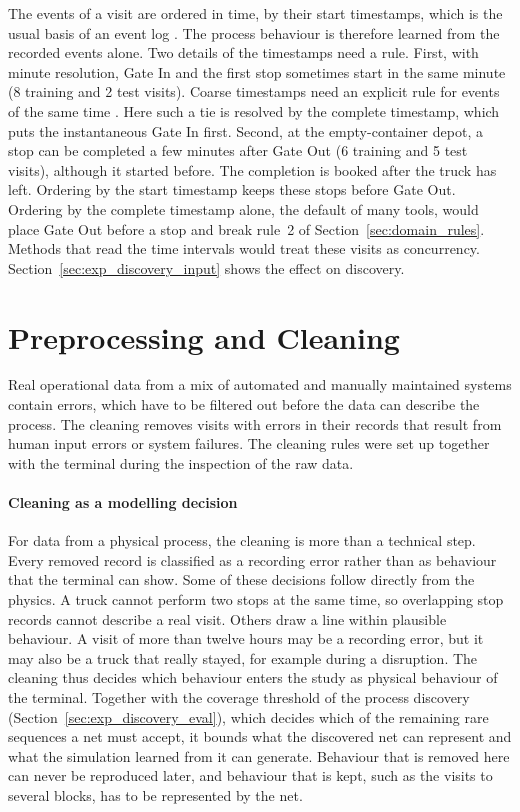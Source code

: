 The events of a visit are ordered in time, by their start timestamps, which is the
usual basis of an event log \cite{DeWeerdt2022EventData}. The process behaviour is
therefore learned from the recorded events alone. Two details of the timestamps
need a rule. First, with minute resolution, Gate In and the first stop sometimes
start in the same minute (8 training and 2 test visits). Coarse timestamps need an
explicit rule for events of the same time \cite{vanderAalst2022Order}. Here such a
tie is resolved by the complete timestamp, which puts the instantaneous Gate In
first. Second, at the empty-container depot, a stop can be
completed a few minutes after Gate Out (6 training and 5 test visits), although it
started before. The completion is booked after the truck has left. Ordering by the
start timestamp keeps these stops before Gate Out. Ordering by the complete
timestamp alone, the default of many tools, would place Gate Out before a stop and
break rule~2 of Section~\ref{sec:domain_rules}. Methods that read the time
intervals would treat these visits as concurrency.
Section~\ref{sec:exp_discovery_input} shows the effect on discovery.

\section{Preprocessing and Cleaning}
\label{sec:cleaning_population}

Real operational data from a mix of automated and manually maintained systems
contain errors, which have to be filtered out before the data can describe the
process. The cleaning removes visits with errors in their records that result
from human input errors or system failures. The cleaning rules were set up
together with the terminal during the inspection of the raw data.

\paragraph{Cleaning as a modelling decision} For data from a physical process, the
cleaning is more than a technical step. Every removed record is classified as a
recording error rather than as behaviour that the terminal can show. Some of these
decisions follow directly from the physics. A truck cannot perform two stops at
the same time, so overlapping stop records cannot describe a real visit. Others
draw a line within plausible behaviour. A visit of more than twelve hours may be a
recording error, but it may also be a truck that really stayed, for example during
a disruption. The cleaning thus decides which behaviour enters the study as
physical behaviour of the terminal. Together with the coverage threshold of the
process discovery (Section~\ref{sec:exp_discovery_eval}), which decides which of
the remaining rare sequences a net must accept, it bounds what the discovered net
can represent and what the simulation learned from it can generate. Behaviour that
is removed here can never be reproduced later, and behaviour that is kept, such as
the visits to several blocks, has to be represented by the net.

